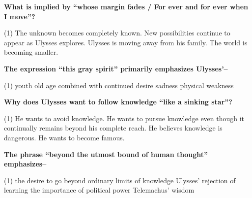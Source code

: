 \documentclass[12pt,a4paper]{exam}
\begin{document}
\begin{questions}

	\begin{minipage}{\textwidth}
		\question \textbf{What is implied by ``whose margin fades / For ever and for ever when I move''?}

		\begin{tasks}(1)
			\task The unknown becomes completely known.
			\task New possibilities continue to appear as Ulysses explores.
			\task Ulysses is moving away from his family.
			\task The world is becoming smaller.
		\end{tasks}
	\end{minipage}


	\begin{minipage}{\textwidth}
		\question \textbf{The expression ``this gray spirit'' primarily emphasizes Ulysses'--}

		\begin{tasks}(1)
			\task youth
			\task old age combined with continued desire
			\task sadness
			\task physical weakness
		\end{tasks}
	\end{minipage}


	\begin{minipage}{\textwidth}
		\question \textbf{Why does Ulysses want to follow knowledge ``like a sinking star''?}

		\begin{tasks}(1)
			\task He wants to avoid knowledge.
			\task He wants to pursue knowledge even though it continually remains beyond his complete reach.
			\task He believes knowledge is dangerous.
			\task He wants to become famous.
		\end{tasks}
	\end{minipage}


	\begin{minipage}{\textwidth}
		\question \textbf{The phrase ``beyond the utmost bound of human thought'' emphasizes--}

		\begin{tasks}(1)
			\task the desire to go beyond ordinary limits of knowledge
			\task Ulysses' rejection of learning
			\task the importance of political power
			\task Telemachus' wisdom
		\end{tasks}
	\end{minipage}


\end{questions}
\end{document}
